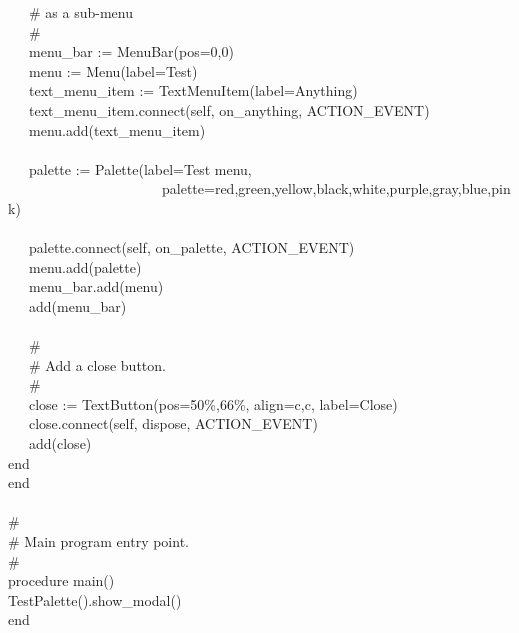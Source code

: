 {\>   \ \ \ \# as a sub-menu \\
\>   \ \ \ \# \\
\>   \ \ \ menu\_bar := MenuBar({\textquotedbl}pos=0,0{\textquotedbl}) \\
\>   \ \ \ menu := Menu({\textquotedbl}label=Test{\textquotedbl}) \\
\>   \ \ \ text\_menu\_item :=
TextMenuItem({\textquotedbl}label=Anything{\textquotedbl}) \\
\>   \ \ \ text\_menu\_item.connect(self,
{\textquotedbl}on\_anything{\textquotedbl}, ACTION\_EVENT) \\
\>   \ \ \ menu.add(text\_menu\_item) \\
\ \\
\>   \ \ \ palette := Palette({\textquotedbl}label=Test
menu{\textquotedbl}, \\
\>   \ \ \ \ \ \ \ \ \ \ \ \ \ \ \ \ \ \ \ \ \ \ {\textquotedbl}palette=red,green,yellow,black,white,purple,gray,blue,pink{\textquotedbl}) \\
\ \\
\>   \ \ \ palette.connect(self,
{\textquotedbl}on\_palette{\textquotedbl}, ACTION\_EVENT) \\
\>   \ \ \ menu.add(palette) \\
\>   \ \ \ menu\_bar.add(menu) \\
\>   \ \ \ add(menu\_bar) \\
\ \\
\>   \ \ \ \# \\
\>   \ \ \ \# Add a close button.  \\
\>   \ \ \ \# \\
\>   \ \ \ close :=
TextButton({\textquotedbl}pos=50\%,66\%{\textquotedbl},
{\textquotedbl}align=c,c{\textquotedbl},
{\textquotedbl}label=Close{\textquotedbl}) \\
\>   \ \ \ close.connect(self, {\textquotedbl}dispose{\textquotedbl},
ACTION\_EVENT) \\
\>   \ \ \ add(close) \\
\>   end \\
end \\
\ \\
\# \\
\# Main program entry point. \\
\# \\
procedure main() \\
\>   TestPalette().show\_modal() \\
end
}

\bigskip

